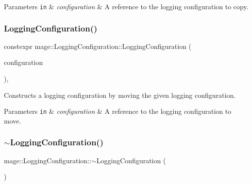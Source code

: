 \begin{DoxyParams}[1]{Parameters}
\mbox{\tt in}  & {\em configuration} & A reference to the logging configuration to copy. \\
\hline
\end{DoxyParams}
\mbox{\label{classmage_1_1_logging_configuration_a7cd5793f3a568c82fe29c33ee66aeb14}} 
\subsubsection{\texorpdfstring{Logging\+Configuration()}{LoggingConfiguration()}\hspace{0.1cm}{\footnotesize\ttfamily [3/3]}}
{\footnotesize\ttfamily constexpr mage\+::\+Logging\+Configuration\+::\+Logging\+Configuration (\begin{DoxyParamCaption}\item[{\mbox{\hyperlink{classmage_1_1_logging_configuration}{Logging\+Configuration}} \&\&}]{configuration }\end{DoxyParamCaption})\hspace{0.3cm}{\ttfamily [default]}, {\ttfamily [noexcept]}}

Constructs a logging configuration by moving the given logging configuration.


\begin{DoxyParams}[1]{Parameters}
\mbox{\tt in}  & {\em configuration} & A reference to the logging configuration to move. \\
\hline
\end{DoxyParams}
\mbox{\label{classmage_1_1_logging_configuration_a842cd1d5cf22c9fb6e2c76e684cd08ee}} 
\subsubsection{\texorpdfstring{$\sim$\+Logging\+Configuration()}{~LoggingConfiguration()}}
{\footnotesize\ttfamily mage\+::\+Logging\+Configuration\+::$\sim$\+Logging\+Configuration (\begin{DoxyParamCaption}{ }\end{DoxyParamCaption})\hspace{0.3cm}{\ttfamily [default]}}

